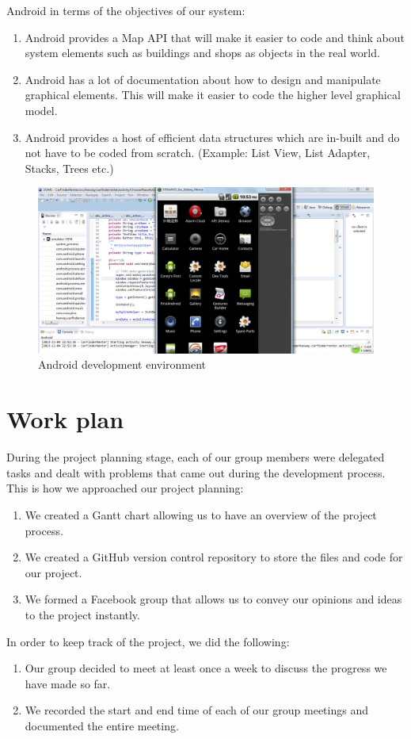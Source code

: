 \documentclass[10pt,a4paper,oneside]{report}
\begin{document}
Android in terms of the objectives of our system:
\begin{enumerate}
\item{Android provides a Map API that will make it easier to code and think about system elements such as buildings and shops as objects in the real world.}
\item{Android has a lot of documentation about how to design and manipulate graphical elements. This will make it easier to code the higher level graphical model.}
\item{Android provides a host of efficient data structures which are in-built and do not have to be coded from scratch. (Example: List View, List Adapter, Stacks, Trees etc.)}
\end{enumerate}

\begin{figure}[H]
 \caption{Android development environment}
 \centering
 \includegraphics[keepaspectratio, width=\textwidth]{androiddev.png}
\end{figure}

\section*{Work plan}
During the project planning stage, each of our group members were delegated tasks and dealt with problems that came out during the development process.
This is how we approached our project planning:
\begin{enumerate}
\item{We created a Gantt chart allowing us to have an overview of the project process.}
\item{We created a GitHub version control repository to store the files and code for our project.}
\item{We formed a Facebook group that allows us to convey our opinions and ideas to the project instantly.}
\end{enumerate}
In order to keep track of the project, we did the following:
\begin{enumerate}
\item{Our group decided to meet at least once a week to discuss the progress we have made so far.}
\item{We recorded the start and end time of each of our group meetings and documented the entire meeting.}
\end{enumerate}
\end{document}
